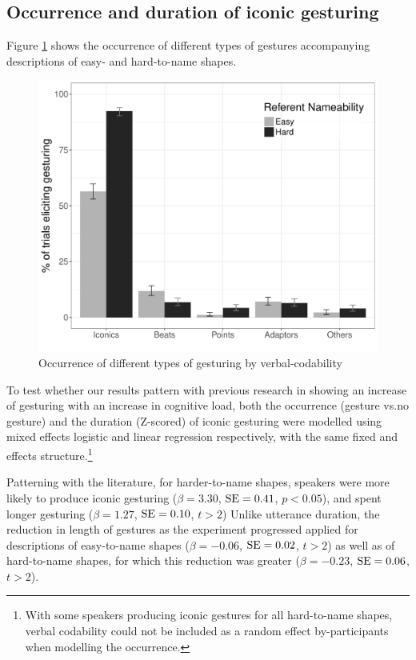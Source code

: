 \documentclass[a4paper,man,natbib]{apa6}
\newcommand{\resultsLog}[3]{$\beta = #1$, $\textnormal{SE} = #2$, $p #3$}
\newcommand{\resultsLM}[3]{$\beta = #1$, $\textnormal{SE} = #2$, $t #3$}
\begin{document}
\subsection{Occurrence and duration of iconic gesturing}
Figure \ref{fig:gtypes} shows the occurrence of different types of gestures accompanying descriptions of easy- and hard-to-name shapes.
\begin{figure}
  \centering
	\includegraphics[width=\linewidth]{img/prop_plot.pdf}
  \caption{Occurrence of different types of gesturing by verbal-codability}
  \label{fig:gtypes}
\end{figure}

To test whether our results pattern with previous research in showing an increase of gesturing with an increase in cognitive load, both the occurrence (gesture vs.\@ no gesture) and the duration (Z-scored) of iconic gesturing were modelled using mixed effects logistic and linear regression respectively, with the same fixed and effects structure.\footnote{With some speakers producing iconic gestures for all hard-to-name shapes, verbal codability could not be included as a random effect by-participants when modelling the occurrence.}

Patterning with the literature, for harder-to-name shapes, speakers were more likely to produce iconic gesturing (\resultsLog{3.30}{0.41}{<0.05}), and spent longer gesturing (\resultsLM{1.27}{0.10}{>2})
Unlike utterance duration, the reduction in length of gestures as the experiment progressed applied for descriptions of easy-to-name shapes (\resultsLM{-0.06}{0.02}{>2}) as well as of hard-to-name shapes, for which this reduction was greater (\resultsLM{-0.23}{0.06}{>2}).
\end{document}
